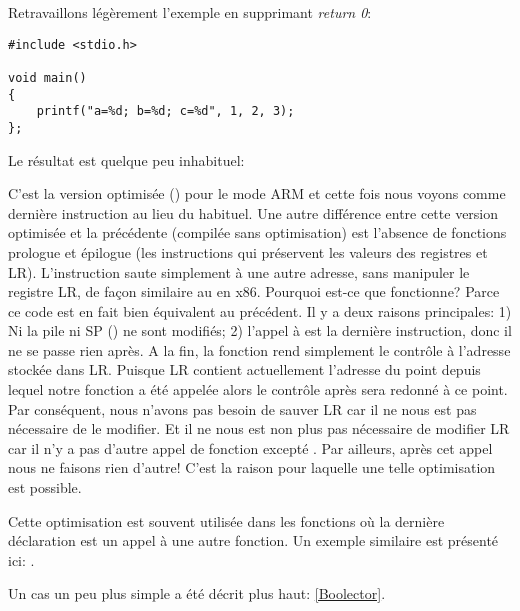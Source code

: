 \label{ARM_B_to_printf}

Retravaillons légèrement l'exemple en supprimant \emph{return 0}:

\begin{lstlisting}[style=customc]
#include <stdio.h>

void main()
{
	printf("a=%d; b=%d; c=%d", 1, 2, 3);
};
\end{lstlisting}

Le résultat est quelque peu inhabituel:



C'est la version optimisée (\Othree) pour le mode ARM et cette fois nous voyons
 comme dernière instruction au lieu du  habituel.
Une autre différence entre cette version optimisée et la précédente (compilée
sans optimisation) est l'absence de fonctions prologue et épilogue (les instructions
qui préservent les valeurs des registres  et \ac{LR}).
L'instruction  saute simplement à une autre adresse, sans manipuler le registre
\ac{LR}, de façon similaire au \JMP en x86.
Pourquoi est-ce que fonctionne? Parce ce code est en fait bien équivalent au précédent.
Il y a deux raisons principales: 1) Ni la pile ni \ac{SP} ()
ne sont modifiés;
2) l'appel à \printf est la dernière instruction, donc il ne se passe rien après.
A la fin, la fonction \printf rend simplement le contrôle à l'adresse stockée
dans \ac{LR}.
Puisque \ac{LR} contient actuellement l'adresse du point depuis lequel notre fonction
a été appelée alors le contrôle après \printf sera redonné à ce point.
Par conséquent, nous n'avons pas besoin de sauver \ac{LR} car il ne nous est pas
nécessaire de le modifier.
Et il ne nous est non plus pas nécessaire de modifier \ac{LR} car il n'y a pas d'autre
appel de fonction excepté \printf. Par ailleurs, après cet appel nous ne faisons
rien d'autre!
C'est la raison pour laquelle une telle optimisation est possible.

Cette optimisation est souvent utilisée dans les fonctions où la dernière déclaration
est un appel à une autre fonction.
Un exemple similaire est présenté ici:
.

Un cas un peu plus simple a été décrit plus haut: \ref{Boolector}.

